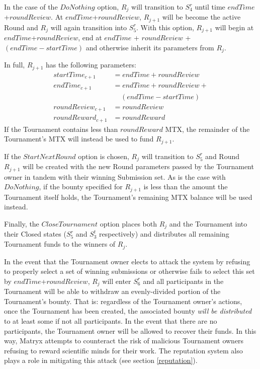 \documentclass[a4paper, 10pt, conference]{ieeeconf}      %
\begin{document}
In the case of the $DoNothing$ option, $R_j$ will transition to $S_{4}^r$ until time $endTime$+$roundReview$. At $endTime$+$roundReview$, $R_{j+1}$ will be become the active Round and $R_j$ will again transition into $S_{5}^r$. With this option, $R_{j+1}$ will begin at $endTime$+$roundReview$, end at $endTime$ + $roundReview$ + $(endTime-startTime)$ and otherwise inherit its parameters from $R_j$.

In full, $R_{j+1}$ has the following parameters:
\begin{align*}
startTime_{c+1} &=  endTime + roundReview \\
endTime_{c+1} &= endTime + roundReview +  \\
& \;\;\;\; (endTime-startTime) \\
roundReview_{c+1} &= roundReview \\
roundReward_{c+1} &= roundReward
\end{align*}
If the Tournament contains less than $roundReward$ MTX, the remainder of the Tournament's MTX will instead be used to fund $R_{j+1}$.

If the $StartNextRound$ option is chosen, $R_j$ will transition to $S_5^r$ and Round $R_{j+1}$ will be created with the new Round parameters passed by the Tournament owner in tandem with their winning Submission set. As is the case with $DoNothing$, if the bounty specified for $R_{j+1}$ is less than the amount the Tournament itself holds, the Tournament's remaining MTX balance will be used instead.

Finally, the $CloseTournament$ option places both $R_j$ and the Tournament into their Closed states ($S_{5}^r$ and $S_{3}^t$ respectively) and distributes all remaining Tournament funds to the winners of $R_j$.

In the event that the Tournament owner elects to attack the system by refusing to properly select a set of winning submissions or otherwise fails to select this set by $endTime$+$roundReview$, $R_j$ will enter $S_{6}^r$ and all participants in the Tournament will be able to withdraw an evenly-divided portion of the Tournament's bounty.
That is: regardless of the Tournament owner's actions, once the Tournament has been created, the associated bounty {\it will be distributed} to at least some if not all participants. In the event that there are no participants, the Tournament owner will be allowed to recover their funds.
In this way, Matryx attempts to counteract the risk of malicious Tournament owners refusing to reward scientific minds for their work. The reputation system also plays a role in mitigating this attack (see section \ref{reputation}).
\end{document}

